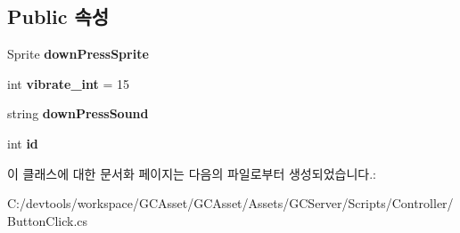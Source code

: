 \subsection*{Public 속성}
\begin{DoxyCompactItemize}
\item 
\hypertarget{class_button_click_a48a07b5034b25eef2a7baf6d205ee5a5}{}Sprite {\bfseries down\+Press\+Sprite}\label{class_button_click_a48a07b5034b25eef2a7baf6d205ee5a5}

\item 
\hypertarget{class_button_click_a67d83145735e80e3d861824de03c4316}{}int {\bfseries vibrate\+\_\+int} = 15\label{class_button_click_a67d83145735e80e3d861824de03c4316}

\item 
\hypertarget{class_button_click_aafe0162741cd71c14b72ebe03fe0497e}{}string {\bfseries down\+Press\+Sound}\label{class_button_click_aafe0162741cd71c14b72ebe03fe0497e}

\item 
\hypertarget{class_button_click_a688591097ac528d9d5b8fd70e98689bd}{}int {\bfseries id}\label{class_button_click_a688591097ac528d9d5b8fd70e98689bd}

\end{DoxyCompactItemize}


이 클래스에 대한 문서화 페이지는 다음의 파일로부터 생성되었습니다.\+:\begin{DoxyCompactItemize}
\item 
C\+:/devtools/workspace/\+G\+C\+Asset/\+G\+C\+Asset/\+Assets/\+G\+C\+Server/\+Scripts/\+Controller/Button\+Click.\+cs\end{DoxyCompactItemize}
